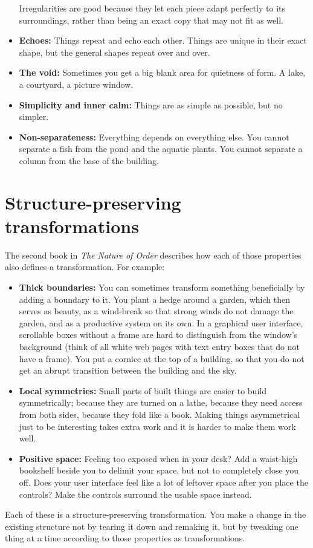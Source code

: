 \begin{itemize}
Irregularities are good because they let each piece adapt perfectly to its
surroundings, rather than being an exact copy that may not fit as well.
 \item \textbf{Echoes:} Things repeat and echo each other. Things are unique in
their exact shape, but the general shapes repeat over and over.
 \item \textbf{The void:} Sometimes you get a big blank area for quietness of
form. A lake, a courtyard, a picture window.
 \item \textbf{Simplicity and inner calm:} Things are as simple as possible, but
no simpler.
 \item \textbf{Non-separateness:} Everything depends on everything else. You cannot separate a fish from the pond and the aquatic plants. You cannot separate a
column from the base of the building.
\end{itemize}

\section*{Structure-preserving transformations}

The second book in \textit{The Nature of Order} describes how each of those
properties also defines a transformation. For example:
\begin{itemize}
 \item \textbf{Thick boundaries:} You can sometimes transform something
beneficially by adding a boundary to it. You plant a hedge around a garden,
which then serves as beauty, as a wind-break so that strong winds do not damage
the garden, and as a productive system on its own. In a graphical user
interface, scrollable boxes without a frame are hard to distinguish from the
window's background (think of all white web pages with text entry boxes that do
not have a frame). You put a cornice at the top of a building, so that you do
not get an abrupt transition between the building and the sky.
 \item \textbf{Local symmetries:} Small parts of built things are easier to
build symmetrically; because they are turned on a lathe, because they need
access from both sides, because they fold like a book. Making things
asymmetrical just to be interesting takes extra work and it is harder to make
them work well.
 \item \textbf{Positive space:} Feeling too exposed when in your desk?  Add a
waist-high bookshelf beside you to delimit your space, but not to completely
close you off. Does your user interface feel like a lot of leftover space after
you place the controls?  Make the controls surround the usable space instead.
\end{itemize}
Each of these is a structure-preserving transformation. You make a change in the
existing structure not by tearing it down and remaking it, but by tweaking one
thing at a time according to those properties as transformations.

